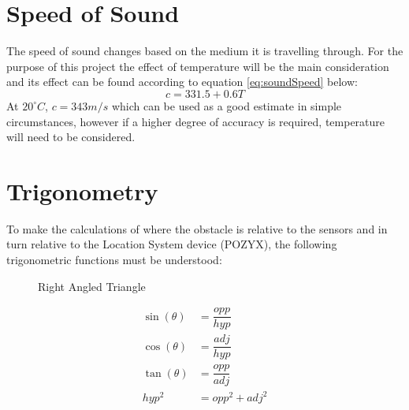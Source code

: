 \documentclass[11pt]{article}
\newcommand{\degrees}{^\circ}
\begin{document}
			\section{Speed of Sound}\label{section:sound}
				The speed of sound changes based on the medium it is travelling through. For the purpose of this project the effect of temperature will be the main consideration and its effect can be found according to equation \ref{eq:soundSpeed} below:
				\begin{equation}\label{eq:soundSpeed}
					c = 331.5 + 0.6T
				\end{equation}
				\cite{soundTemp} At $20\degrees C$, $c = 343m/s$ which can be used as a good estimate in simple circumstances, however if a higher degree of accuracy is required, temperature will need to be considered.
				
			\section{Trigonometry}
				To make the calculations of where the obstacle is relative to the sensors and in turn relative to the Location System device (POZYX), the following trigonometric functions must be understood:
				\begin{multicols}{2}
					\begin{figure}[H]
						\begin{center}
							\caption{Right Angled Triangle}
							\label{fig:trig}
						\end{center}
					\end{figure}
				
					\begin{align}
						\sin(\theta) 	& = \dfrac{opp}{hyp}	\nonumber\\
						\cos(\theta) 	& = \dfrac{adj}{hyp}	\nonumber\\
						\tan(\theta) 	& = \dfrac{opp}{adj}	\nonumber\\
						hyp^2 			& = opp^2 + adj^2
					\end{align}
				\end{multicols}
					
\end{document}
